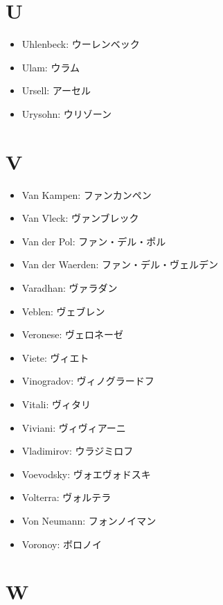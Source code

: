\documentclass[openany, a4paper, oneside]{jsbook}
\begin{document}
\section{U}

\begin{itemize}
\item Uhlenbeck: ウーレンベック
\item Ulam: ウラム
\item Ursell: アーセル
\item Urysohn: ウリゾーン
\end{itemize}
\section{V}

\begin{itemize}
\item Van Kampen: ファンカンペン
\item Van Vleck: ヴァンブレック
\item Van der Pol: ファン・デル・ポル
\item Van der Waerden: ファン・デル・ヴェルデン
\item Varadhan: ヴァラダン
\item Veblen: ヴェブレン
\item Veronese: ヴェロネーゼ
\item Viete: ヴィエト
\item Vinogradov: ヴィノグラードフ
\item Vitali: ヴィタリ
\item Viviani: ヴィヴィアーニ
\item Vladimirov: ウラジミロフ
\item Voevodsky: ヴォエヴォドスキ
\item Volterra: ヴォルテラ
\item Von Neumann: フォンノイマン
\item Voronoy: ボロノイ
\end{itemize}
\section{W}
\end{document}
